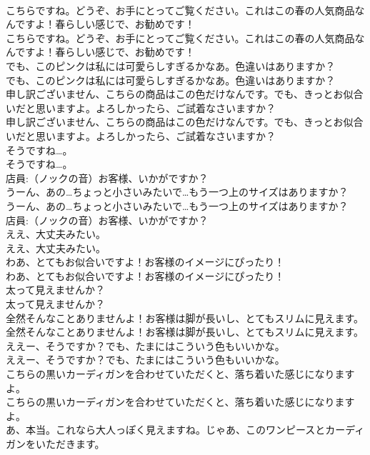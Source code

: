 \documentclass[8pt]{extreport}
\begin{document}
\begin{CJK}{UTF8}{min}
\\	こちらですね。どうぞ、お手にとってご覧ください。これはこの春の人気商品なんですよ！春らしい感じで、お勧めです！	
\\	こちらですね。どうぞ、お手にとってご覧ください。これはこの春の人気商品なんですよ！春らしい感じで、お勧めです！ 
\\	でも、このピンクは私には可愛らしすぎるかなあ。色違いはありますか？	
\\	でも、このピンクは私には可愛らしすぎるかなあ。色違いはありますか？ 
\\	申し訳ございません、こちらの商品はこの色だけなんです。でも、きっとお似合いだと思いますよ。よろしかったら、ご試着なさいますか？	
\\	申し訳ございません、こちらの商品はこの色だけなんです。でも、きっとお似合いだと思いますよ。よろしかったら、ご試着なさいますか？ 
\\	そうですね…。	
\\	そうですね…。 
\\	店員:（ノックの音）お客様、いかがですか？	
\\	うーん、あの…ちょっと小さいみたいで…もう一つ上のサイズはありますか？	
\\	うーん、あの…ちょっと小さいみたいで…もう一つ上のサイズはありますか？ 
\\	店員:（ノックの音）お客様、いかがですか？	
\\	ええ、大丈夫みたい。	
\\	ええ、大丈夫みたい。 
\\	わあ、とてもお似合いですよ！お客様のイメージにぴったり！	
\\	わあ、とてもお似合いですよ！お客様のイメージにぴったり！ 
\\	太って見えませんか？	
\\	太って見えませんか？ 
\\	全然そんなことありませんよ！お客様は脚が長いし、とてもスリムに見えます。	
\\	全然そんなことありませんよ！お客様は脚が長いし、とてもスリムに見えます。 
\\	ええー、そうですか？でも、たまにはこういう色もいいかな。	
\\	ええー、そうですか？でも、たまにはこういう色もいいかな。 
\\	こちらの黒いカーディガンを合わせていただくと、落ち着いた感じになりますよ。	
\\	こちらの黒いカーディガンを合わせていただくと、落ち着いた感じになりますよ。 
\\	あ、本当。これなら大人っぽく見えますね。じゃあ、このワンピースとカーディガンをいただきます。	

\end{CJK}
\end{document}
